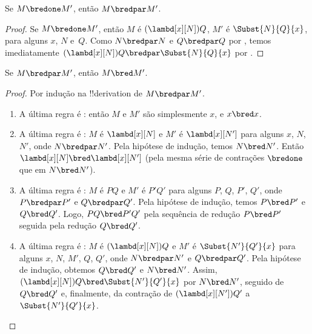 \documentclass[../../../include/open-logic-section]{subfiles}
\begin{document}


\begin{lem}
  Se $M \bredone M'$, então $M \bredpar M'$.
\end{lem}
\begin{proof} Se $M \bredone M'$, então $M$ é
    $(\lambd[x][N])Q$, $M'$ é $\Subst{N}{Q}{x}$, para alguns
    $x$, $N$ e~$Q$. Como $N \bredpar N$ e $Q \bredpar Q$ por
    , temos imediatamente $(\lambd[x][N])Q
    \bredpar \Subst{N}{Q}{x}$ por
    .
\end{proof}

\begin{lem}
  Se $M \bredpar M'$, então $M \bred M'$.
\end{lem}

\begin{proof} Por indução na !!{derivation} de $M \bredpar M'$.
  \begin{enumerate}
  \item A última regra é : então $M$ e $M'$ são
    simplesmente $x$, e $x \bred x$.
  \item A última regra é : $M$ é
    $\lambd[x][N]$ e $M'$ é $\lambd[x][N']$ para alguns $x$, $N$, $N'$,
    onde $N \bredpar N'$. Pela hipótese de indução, temos $N \bred N'$.
    Então $\lambd[x][N] \bred \lambd[x][N']$ (pela mesma série de contrações
    $\bredone$ que em $N \bred N'$).
  \item A última regra é : $M$ é $PQ$ e $M'$ é
    $P'Q'$ para alguns $P$, $Q$, $P'$, $Q'$, onde $P \bredpar P'$ e
    $Q \bredpar Q'$. Pela hipótese de indução, temos $P \bred P'$ e
    $Q \bred Q'$. Logo, $PQ \bred P'Q'$ pela sequência de redução
    $P \bred P'$ seguida pela redução $Q \bred Q'$.
  \item A última regra é : $M$ é
    $(\lambd[x][N])Q$ e $M'$ é $\Subst{N'}{Q'}{x}$ para alguns $x$,
    $N$, $M'$, $Q$, $Q'$, onde $N \bredpar N'$ e $Q \bredpar Q'$.
    Pela hipótese de indução, obtemos $Q \bred Q'$ e $N \bred N'$. Assim,
    $(\lambd[x][N])Q \bred \Subst{N'}{Q'}{x}$ por $N \bred N'$, seguido
    de $Q \bred Q'$ e, finalmente, da contração de $(\lambd[x][N'])Q'$ a
    $\Subst{N'}{Q'}{x}$.
  \end{enumerate}
\end{proof}
\end{document}

